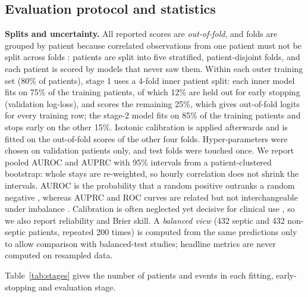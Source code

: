\documentclass[preprint,12pt]{elsarticle}
\begin{document}



\subsection{Evaluation protocol and statistics}
\textbf{Splits and uncertainty.} All reported scores are \emph{out-of-fold}, and folds are grouped by patient because correlated observations from one patient must not be split across folds \cite{roberts2017}: patients are split into five stratified, patient-disjoint folds, and each patient is scored by models that never saw them. Within each outer training set (80\% of patients), stage 1 uses a 4-fold inner patient split: each inner model fits on 75\% of the training patients, of which 12\% are held out for early stopping (validation log-loss), and scores the remaining 25\%, which gives out-of-fold logits for every training row; the stage-2 model fits on 85\% of the training patients and stops early on the other 15\%. Isotonic calibration is applied afterwards and is fitted on the out-of-fold scores of the other four folds. Hyper-parameters were chosen on validation patients only, and test folds were touched once. We report pooled AUROC and AUPRC with 95\% intervals from a patient-clustered bootstrap: whole stays are re-weighted, so hourly correlation does not shrink the intervals. AUROC is the probability that a random positive outranks a random negative \cite{hanley1982}, whereas AUPRC and ROC curves are related but not interchangeable under imbalance \cite{davis2006,saito2015}. Calibration is often neglected yet decisive for clinical use \cite{vancalster2019}, so we also report reliability and Brier skill. A \emph{balanced view} (432 septic and 432 non-septic patients, repeated 200 times) is computed from the same predictions only to allow comparison with balanced-test studies; headline metrics are never computed on resampled data.

Table~\ref{tab:stages} gives the number of patients and events in each fitting, early-stopping and evaluation stage.
\end{document}

